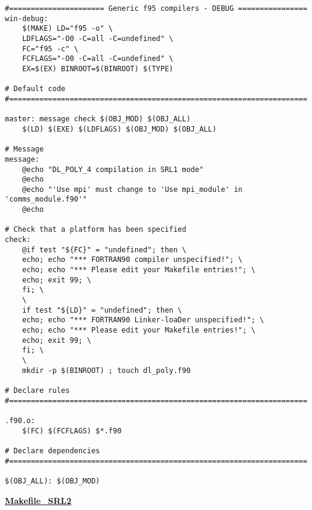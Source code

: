 \begin{verbatim}
#====================== Generic f95 compilers - DEBUG ================
win-debug:
	$(MAKE) LD="f95 -o" \
	LDFLAGS="-O0 -C=all -C=undefined" \
	FC="f95 -c" \
	FCFLAGS="-O0 -C=all -C=undefined" \
	EX=$(EX) BINROOT=$(BINROOT) $(TYPE)

# Default code
#=====================================================================

master: message check $(OBJ_MOD) $(OBJ_ALL)
	$(LD) $(EXE) $(LDFLAGS) $(OBJ_MOD) $(OBJ_ALL)

# Message
message:
	@echo "DL_POLY_4 compilation in SRL1 mode"
	@echo
	@echo "'Use mpi' must change to 'Use mpi_module' in 'comms_module.f90'"
	@echo

# Check that a platform has been specified
check:
	@if test "${FC}" = "undefined"; then \
	echo; echo "*** FORTRAN90 compiler unspecified!"; \
	echo; echo "*** Please edit your Makefile entries!"; \
	echo; exit 99; \
	fi; \
	\
	if test "${LD}" = "undefined"; then \
	echo; echo "*** FORTRAN90 Linker-loaDer unspecified!"; \
	echo; echo "*** Please edit your Makefile entries!"; \
	echo; exit 99; \
	fi; \
	\
	mkdir -p $(BINROOT) ; touch dl_poly.f90

# Declare rules
#=====================================================================

.f90.o:
	$(FC) $(FCFLAGS) $*.f90

# Declare dependencies
#=====================================================================

$(OBJ_ALL): $(OBJ_MOD)
\end{verbatim}
\clearpage
{\sc \bf \underline{Makefile\_SRL2}}
